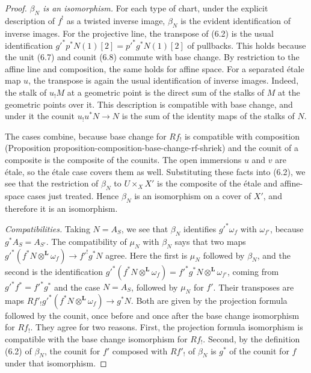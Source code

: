 \documentclass[11pt]{article}
\begin{document}
\begin{proof}[{Proof}]
\emph{\(\beta_N\) is an isomorphism.} For each type of chart, under the explicit description of \(f^!\) as a twisted inverse image, \(\beta_N\) is the evident identification of inverse images. For the projective line, the transpose of (6.2) is the usual identification \(g'^*p^*N(1)[2]=p'^*g^*N(1)[2]\) of pullbacks. This holds because the unit (6.7) and counit (6.8) commute with base change. By restriction to the affine line and composition, the same holds for affine space. For a separated étale map \(u\), the transpose is again the usual identification of inverse images. Indeed, the stalk of \(u_!M\) at a geometric point is the direct sum of the stalks of \(M\) at the geometric points over it. This description is compatible with base change, and under it the counit \(u_!u^*N\to N\) is the sum of the identity maps of the stalks of \(N\).

The cases combine, because base change for \(Rf_!\) is compatible with composition (Proposition proposition-composition-base-change-rf-shriek) and the counit of a composite is the composite of the counits. The open immersions \(u\) and \(v\) are étale, so the étale case covers them as well. Substituting these facts into (6.2), we see that the restriction of \(\beta_N\) to \(U\times_XX'\) is the composite of the étale and affine-space cases just treated. Hence \(\beta_N\) is an isomorphism on a cover of \(X'\), and therefore it is an isomorphism.

\emph{Compatibilities.} Taking \(N=A_S\), we see that \(\beta_N\) identifies \(g'^*\omega_f\) with \(\omega_{f'}\), because \(g^*A_S=A_{S'}\). The compatibility of \(\mu_N\) with \(\beta_N\) says that two maps \(g'^*(f^*N\otimes^{\mathbf L}\omega_f)\to f'^!g^*N\) agree. Here the first is \(\mu_N\) followed by \(\beta_N\), and the second is the identification \(g'^*(f^*N\otimes^{\mathbf L}\omega_f)=f'^*g^*N\otimes^{\mathbf L}\omega_{f'}\), coming from \(g'^*f^*=f'^*g^*\) and the case \(N=A_S\), followed by \(\mu_N\) for \(f'\). Their transposes are maps \(Rf'_!g'^*(f^*N\otimes^{\mathbf L}\omega_f)\to g^*N\). Both are given by the projection formula followed by the counit, once before and once after the base change isomorphism for \(Rf_!\). They agree for two reasons. First, the projection formula isomorphism is compatible with the base change isomorphism for \(Rf_!\). Second, by the definition (6.2) of \(\beta_N\), the counit for \(f'\) composed with \(Rf'_!\) of \(\beta_N\) is \(g^*\) of the counit for \(f\) under that isomorphism.
\end{proof}
\end{document}
